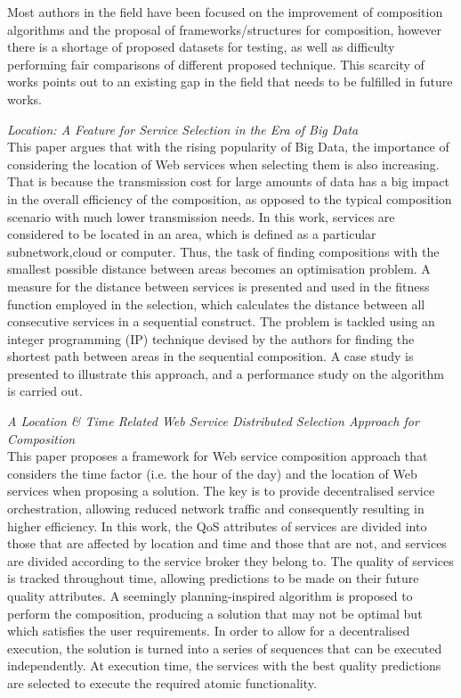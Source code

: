 Most authors in the field have been focused on the improvement of composition algorithms and the proposal of frameworks/structures for composition, however there is a shortage of
proposed datasets for testing, as well as difficulty performing fair comparisons of different proposed technique. This scarcity of works points out to an existing gap in the field
that needs to be fulfilled in future works.

\textit{Location: A Feature for Service Selection in the Era of Big Data \cite{zhiling2013location}}\\
This paper argues that with the rising popularity of Big Data, the importance of considering the location of Web services when selecting
them is also increasing. That is because the transmission cost for large amounts of data has a big impact in the overall efficiency of the
composition, as opposed to the typical composition scenario with much lower transmission needs. In this work, services are considered
to be located in an area, which is defined as a particular subnetwork,cloud or computer. Thus, the task of finding compositions with the
smallest possible distance between areas becomes an optimisation problem. A measure for the distance between services is presented and used
in the fitness function employed in the selection, which calculates the distance between all consecutive services in a sequential construct.
The problem is tackled using an integer programming (IP) technique devised by the authors for finding the shortest path between areas in the
sequential composition. A case study is presented to illustrate this approach, and a performance study on the algorithm is carried out.

\textit{A Location \& Time Related Web Service Distributed Selection Approach for Composition \cite{liu2010location}}\\
This paper proposes a framework for Web service composition approach that considers the time factor (i.e. the hour of the day) and the location of Web services
when proposing a solution. The key is to provide decentralised service orchestration, allowing reduced network traffic and consequently resulting in higher efficiency. In this
work, the QoS attributes of services are divided into those that are affected by location and time and those that are not, and services are divided according
to the service broker they belong to. The quality of services is tracked throughout time, allowing predictions to be made on their future quality attributes.
A seemingly planning-inspired algorithm is proposed to perform the composition, producing a solution that may not be optimal but which satisfies the user
requirements. In order to allow for a decentralised execution, the solution is turned into a series of sequences that can be executed independently. At
execution time, the services with the best quality predictions are selected to execute the required atomic functionality.

